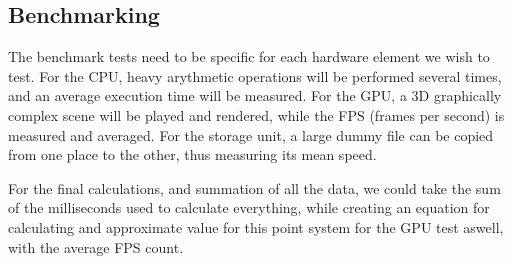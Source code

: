 \documentclass[a4paper,10pt]{report}
\begin{document}
 \subsection{Benchmarking}
 The benchmark tests need to be specific for each hardware element we wish to test. For the CPU, heavy arythmetic operations will be performed several times, and an average execution time will be measured. For the GPU, a 3D graphically complex scene will be played and rendered, while the FPS (frames per second) is measured and averaged. For the storage unit, a large dummy file can be copied from one place to the other, thus measuring its mean speed.
 
 For the final calculations, and summation of all the data, we could take the sum of the milliseconds used to calculate everything, while creating an equation for calculating and approximate value for this point system for the GPU test aswell, with the average FPS count.
\end{document}
